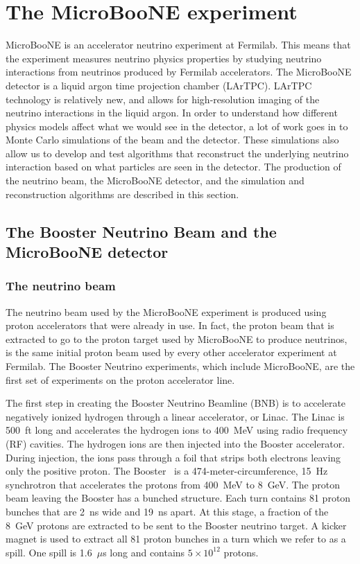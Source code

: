 \section{The MicroBooNE experiment}\label{microboone}
MicroBooNE is an accelerator neutrino experiment at Fermilab. This means that
the experiment measures neutrino physics properties by studying neutrino
interactions from neutrinos produced by Fermilab accelerators. The MicroBooNE
detector is a liquid argon time projection chamber (LArTPC). LArTPC technology
is relatively new, and allows for high-resolution imaging of the neutrino
interactions in the liquid argon. In order to understand how different physics
models affect what we would see in the detector, a lot of work goes in to Monte
Carlo simulations of the beam and the detector. These simulations also allow us
to develop and test algorithms that reconstruct the underlying neutrino
interaction based on what particles are seen in the detector. The production of
the neutrino beam, the MicroBooNE detector, and the simulation and
reconstruction algorithms are described in this section.

\subsection{The Booster Neutrino Beam and the MicroBooNE detector}\label{sec:beam}

  \subsubsection{The neutrino beam}
    The neutrino beam used by the MicroBooNE experiment is produced using proton
    accelerators that were already in use. In fact, the proton beam that is
    extracted to go to the proton target used by MicroBooNE to produce neutrinos,
    is the same initial proton beam used by every other accelerator experiment at
    Fermilab. The Booster Neutrino experiments, which include MicroBooNE, are the
    first set of experiments on the proton accelerator line.

    The first step in creating the Booster Neutrino Beamline (BNB) is to
    accelerate negatively ionized hydrogen through a linear accelerator, or
    Linac. The Linac is 500~ft long and accelerates the hydrogen ions to
    400~MeV using radio frequency (RF) cavities. The hydrogen ions are then
    injected into the Booster accelerator. During injection, the ions pass
    through a foil that strips both electrons leaving only the positive proton.
    The Booster~\cite{MinibooneBeam} is a 474-meter-circumference, 15~Hz
    synchrotron that accelerates the protons from 400~MeV to 8~GeV. The proton
    beam leaving the Booster has a bunched structure. Each turn contains 81
    proton bunches that are 2~ns wide and 19~ns apart. At this stage, a
    fraction of the 8~GeV protons are extracted to be sent to the Booster
    neutrino target. A kicker magnet is used to extract all 81 proton bunches
    in a turn which we refer to as a spill. One spill is 1.6~$\mu$s long and
    contains $5\times 10^{12}$ protons.

